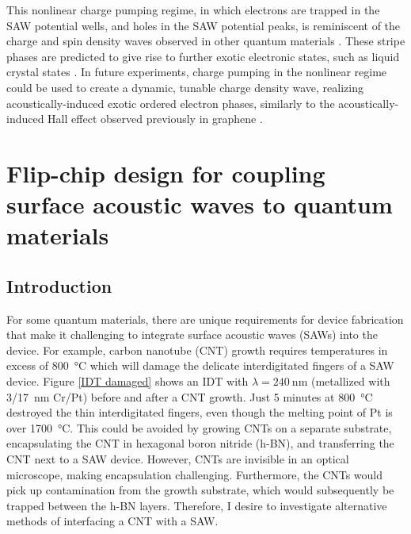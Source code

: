 \documentclass{beavtex_dub_edit}
\begin{document}
This nonlinear charge pumping regime, in which electrons are trapped in the SAW potential wells, and holes in the SAW potential peaks, is reminiscent of the charge and spin density waves observed in other quantum materials \cite{rahnejat_charge_2011,pasztor_multiband_2021}. These stripe phases are predicted to give rise to further exotic electronic states, such as liquid crystal states \cite{fradkin_liquid-crystal_1999}. In future experiments, charge pumping in the nonlinear regime could be used to create a dynamic, tunable charge density wave, realizing acoustically-induced exotic ordered electron phases, similarly to the acoustically-induced Hall effect observed previously in graphene \cite{zhao_acoustically_2022}. 


\chapter[Flip-chip design for coupling surface acoustic waves to quantum materials][Flip-chip design for coupling SAWs to quantum materials]{Flip-chip design for coupling surface acoustic waves to quantum materials} \label{flip-chip chapter}

\section{Introduction}

For some quantum materials, there are unique requirements for device fabrication that make it challenging to integrate surface acoustic waves (SAWs) into the device. For example, carbon nanotube (CNT) growth requires temperatures in excess of \SI{800}{\celsius} which will damage the delicate interdigitated fingers of a SAW device. Figure \ref{IDT damaged} shows an IDT with $\lambda = \SI{240}{\nano\meter}$ (metallized with 3/\SI{17}{\nano\meter} Cr/Pt) before and after a CNT growth. Just 5 minutes at \SI{800}{\celsius} destroyed the thin interdigitated fingers, even though the melting point of Pt is over \SI{1700}{\celsius}. This could be avoided by growing CNTs on a separate substrate, encapsulating the CNT in hexagonal boron nitride (h-BN), and transferring the CNT next to a SAW device. However, CNTs are invisible in an optical microscope, making encapsulation challenging. Furthermore, the CNTs would pick up contamination from the growth substrate, which would subsequently be trapped between the h-BN layers. Therefore, I desire to investigate alternative methods of interfacing a CNT with a SAW.
\end{document}
